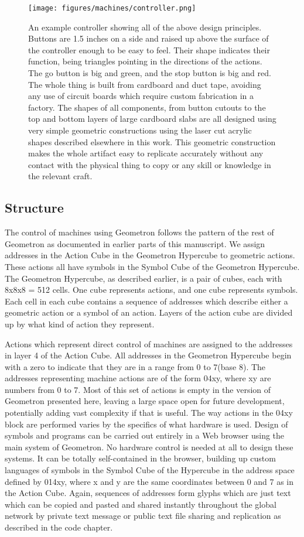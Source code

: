 \begin{figure}
	\centering
	\texttt{[image: figures/machines/controller.png]}
	\caption[controller]
	{An example controller showing all of the above design principles.  Buttons are 1.5 inches on a side and raised up above the surface of the controller enough to be easy to feel.  Their shape indicates their function, being triangles pointing in the directions of the actions.  The go button is big and green, and the stop button is big and red.  The whole thing is built from cardboard and duct tape, avoiding any use of circuit boards which require custom fabrication in a factory.  The shapes of all components, from button cutouts to the top and bottom layers of large cardboard slabs are all designed using very simple geometric constructions using the laser cut acrylic shapes described elsewhere in this work.  This geometric construction makes the whole artifact easy to replicate accurately without any contact with the physical thing to copy or any skill or knowledge in the relevant craft.}
\end{figure}


\subsection{Structure}

The control of machines using Geometron follows the pattern of the rest of Geometron as documented in earlier parts of this manuscript.  We assign addresses in the Action Cube in the Geometron Hypercube to geometric actions.  These actions all have symbols in the Symbol Cube of the Geometron Hypercube.  The Geometron Hypercube, as described earlier, is a pair of cubes, each with 8x8x8 = 512 cells.  One cube represents actions, and one cube represents symbols.  Each cell in each cube contains a sequence of addresses which describe either a geometric action or a symbol of an action.  Layers of the action cube are divided up by what kind of action they represent.  

Actions which represent direct control of machines are assigned to the addresses in layer 4 of the Action Cube.  All addresses in the Geometron Hypercube begin with a zero to indicate that they are in a range from 0 to 7(base 8).  The addresses representing machine actions are of the form 04xy, where xy are numbers from 0 to 7.  Most of this set of actions is empty in the version of Geometron presented here, leaving a large space open for future development, potentially adding vast complexity if that is useful.  The way actions in the 04xy block are performed varies by the specifics of what hardware is used.  Design of symbols and programs can be carried out entirely in a Web browser using the main system of Geometron.  No hardware control is needed at all to design these systems.  It can be totally self-contained in the browser, building up custom languages of symbols in the Symbol Cube of the Hypercube in the address space defined by 014xy, where x and y are the same coordinates between 0 and 7 as in the Action Cube.  Again, sequences of addresses form glyphs which are just text which can be copied and pasted and shared instantly throughout the global network by private text message or public text file sharing and replication as described in the code chapter.

